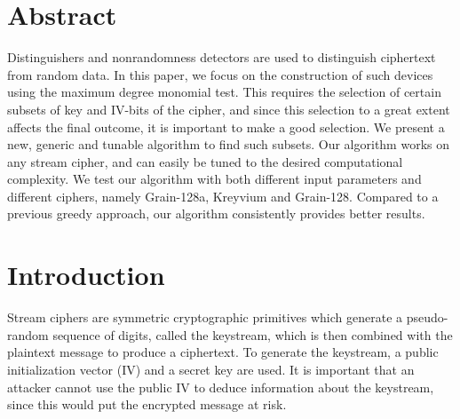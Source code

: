 {%






\section*{Abstract}
Distinguishers and nonrandomness detectors are used to distinguish ciphertext from random data. In this paper, we focus on the construction of such devices using the maximum degree monomial test. This requires the selection of certain subsets of key and IV-bits of the cipher, and since this selection to a great extent affects the final outcome, it is important to make a good selection. We present a new, generic and tunable algorithm to find such subsets. Our algorithm works on any stream cipher, and can easily be tuned to the desired computational complexity. We test our algorithm with both different input parameters and different ciphers, namely Grain-128a, Kreyvium and Grain-128. Compared to a previous greedy approach, our algorithm consistently provides better results.

\section{Introduction}

Stream ciphers are symmetric cryptographic primitives which generate a pseudo-random sequence of digits, called the keystream, which is then combined with the plaintext message to produce a ciphertext. To generate the keystream, a public initialization vector (IV) and a secret key are used. It is important that an attacker cannot use the public IV to deduce information about the keystream, since this would put the encrypted message at risk.

}

